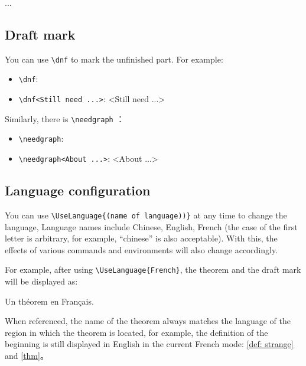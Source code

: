 \documentclass{lebhart}
\begin{document}
\begin{proofidea}
    ...
\end{proofidea}

\subsection{Draft mark}

You can use \lstinline|\dnf| to mark the unfinished part. For example:
\begin{itemize}
    \item \lstinline|\dnf|: \quad \dnf
    \item \lstinline|\dnf<Still need ...>|: \quad \dnf<Still need ...>
\end{itemize}

Similarly, there is \lstinline|\needgraph| ：
\begin{itemize}
    \item \lstinline|\needgraph|: \needgraph
    \item \lstinline|\needgraph<About ...>|: \needgraph<About ...>
\end{itemize}

\subsection{Language configuration}
You can use \lstinline|\UseLanguage{(name of language))}| at any time to change the language, Language names include Chinese, English, French (the case of the first letter is arbitrary, for example, ``chinese'' is also acceptable). With this, the effects of various commands and environments will also change accordingly.

For example, after using \lstinline|\UseLanguage{French}|, the theorem and the draft mark will be displayed as:

\begin{theorem}[Inutile]\label{thm}
    Un théorem en Français. \dnf
\end{theorem}

When referenced, the name of the theorem always matches the language of the region in which the theorem is located, for example, the definition of the beginning is still displayed in English in the current French mode: \cref{def: strange} and \cref{thm}。


\end{document}
